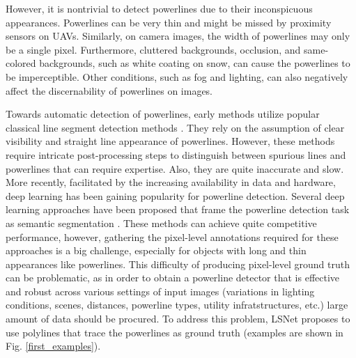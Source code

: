 \documentclass[journal]{IEEEtran}
\begin{document}
However, it is nontrivial to detect powerlines due to their inconspicuous appearances. Powerlines can be very thin and might be missed by proximity sensors on UAVs. Similarly, on camera images, the width of powerlines may only be a single pixel. Furthermore, cluttered backgrounds, occlusion, and same-colored backgrounds, such as white coating on snow, can cause the powerlines to be imperceptible. Other conditions, such as fog and lighting, can also negatively affect the discernability of powerlines on images. 

Towards automatic detection of powerlines, early methods utilize popular classical line segment detection methods \cite{related_work_kasturi_2002, related_work_guanjian_yan_2007, related_work_li_zhenrong_2010, related_work_candamo_2009, related_work_golightly_2005, related_work_zhengrong_li_2008, related_work_boris_alpatov_2016}. They rely on the assumption of clear visibility and straight line appearance of powerlines. However, these methods require intricate post-processing steps to distinguish between spurious lines and powerlines that can require expertise. Also, they are quite inaccurate and slow. 
More recently, facilitated by the increasing availability in data and hardware, deep learning has been gaining popularity
for powerline detection. Several deep learning approaches have been proposed that frame the powerline detection task as semantic segmentation \cite{related_work_rainesh_mandaan_2017,related_work_heng_zhang_2019,related_work_yan_li_2019,related_work_rabab_abdelfattah_2022,related_work_rabeea_haffari_2021}. These methods can achieve quite competitive performance, however, gathering the pixel-level annotations required for these approaches is a big challenge, especially for objects with long and thin appearances like powerlines. This difficulty of producing pixel-level ground truth can be problematic, as in order to obtain a powerline detector that is effective and robust across various settings of input images (variations in lighting conditions, scenes, distances, powerline types, utility infratstructures, etc.) large amount of data should be procured. To address this problem, LSNet \cite{Nguyen2020} proposes to use polylines that trace the powerlines as ground truth (examples are shown in Fig. \ref{first_examples}). 
\end{document}
